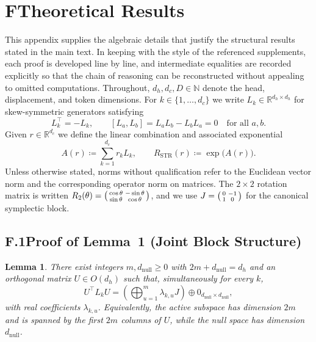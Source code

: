 \documentclass[11pt]{article}
\newcommand{\Real}{\mathbb{R}}
\newtheorem{lemma}{Lemma}
\begin{document}
\clearpage
\appendix
\section*{F\quad Theoretical Results}
\label{sec:appendix-theory}

This appendix supplies the algebraic details that justify the structural results stated in the main text.
In keeping with the style of the referenced supplements, each proof is developed line by line, and
intermediate equalities are recorded explicitly so that the chain of reasoning can be reconstructed
without appealing to omitted computations.  Throughout, $d_h,d_c,D\in\mathbb{N}$ denote the head,
displacement, and token dimensions.  For $k\in\{1,\dots,d_c\}$ we write $L_k\in\Real^{d_h\times d_h}$
for skew-symmetric generators satisfying
\begin{equation}
  L_k^\top = -L_k,
  \qquad
  [L_a,L_b] = L_aL_b - L_bL_a = 0
  \quad\text{for all } a,b.
  \label{eq:appendix-commuting-generators}
\end{equation}
Given $r\in\Real^{d_c}$ we define the linear combination and associated exponential
\begin{equation}
  A(r) \coloneqq \sum_{k=1}^{d_c} r_k L_k,
  \qquad
  R_{\mathrm{STR}}(r) \coloneqq \exp\!\big(A(r)\big).
  \label{eq:appendix-def-A-R}
\end{equation}
Unless otherwise stated, norms without qualification refer to the Euclidean vector norm and the
corresponding operator norm on matrices.  The $2\times 2$ rotation matrix is written
$R_2(\theta) = \begin{psmallmatrix}\cos\theta & -\sin\theta\\ \sin\theta & \cos\theta\end{psmallmatrix}$,
and we use $J = \begin{psmallmatrix}0 & -1\\ 1 & 0\end{psmallmatrix}$ for the canonical symplectic block.

\subsection*{F.1\quad Proof of Lemma~1 (Joint Block Structure)}

\begin{lemma}\label{lem:appendix-block-structure}
There exist integers $m,d_{\mathrm{null}}\ge 0$ with $2m+d_{\mathrm{null}} = d_h$ and an orthogonal
matrix $U\in O(d_h)$ such that, simultaneously for every $k$,
\begin{equation}
  U^\top L_k U =
  \left(\bigoplus_{u=1}^{m} \lambda_{k,u} J\right)
  \oplus 0_{d_{\mathrm{null}}\times d_{\mathrm{null}}},
  \label{eq:appendix-block-L}
\end{equation}
with real coefficients $\lambda_{k,u}$.  Equivalently, the active subspace has dimension $2m$ and is
spanned by the first $2m$ columns of $U$, while the null space has dimension $d_{\mathrm{null}}$.
\end{lemma}
\end{document}
